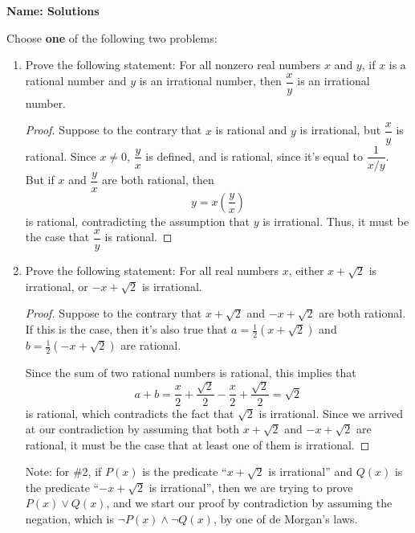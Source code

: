 \documentclass[12pt]{article}
\begin{document}
{\bf Name: Solutions}
\thispagestyle{fancy}

\bigskip
Choose {\bf one} of the following two problems:
\begin{enumerate}
 \item Prove the following statement: For all nonzero real numbers $x$ and $y$, if $x$ is a rational number and $y$ is an irrational number, then $\dfrac{x}{y}$ is an irrational number.
     

\begin{proof}
Suppose to the contrary that $x$ is rational and $y$ is irrational, but $\dfrac{x}{y}$ is rational. Since $x\neq 0$, $\dfrac{y}{x}$ is defined, and is rational, since it's equal to $\dfrac{1}{x/y}$. But if $x$ and $\dfrac{y}{x}$ are both rational, then
\[
 y = x\left(\dfrac{y}{x}\right)
\]
 is rational, contradicting the assumption that $y$ is irrational. Thus, it must be the case that $\dfrac{x}{y}$ is rational.
\end{proof}

\item Prove the following statement: For all real numbers $x$, either $x+\sqrt{2}$ is irrational, or $-x+\sqrt{2}$ is irrational.

\begin{proof}
 Suppose to the contrary that $x+\sqrt{2}$ and $-x+\sqrt{2}$ are both rational. If this is the case, then it's also true that $a = \frac{1}{2}(x+\sqrt{2})$ and $b=\frac{1}{2}(-x+\sqrt{2})$ are rational.

Since the sum of two rational numbers is rational, this implies that
\[
 a+b = \frac{x}{2}+\frac{\sqrt{2}}{2}-\frac{x}{2}+\frac{\sqrt{2}}{2} = \sqrt{2}
\]
is rational, which contradicts the fact that $\sqrt{2}$ is irrational. Since we arrived at our contradiction by assuming that both $x+\sqrt{2}$ and $-x+\sqrt{2}$ are rational, it must be the case that at least one of them is irrational.
\end{proof}
Note: for \#2, if $P(x)$ is the predicate ``$x+\sqrt{2}$ is irrational'' and $Q(x)$ is the predicate ``$-x+\sqrt{2}$ is irrational'', then we are trying to prove $P(x)\vee Q(x)$, and we start our proof by contradiction by assuming the negation, which is $\neg P(x)\wedge \neg Q(x)$, by one of de Morgan's laws.

\end{enumerate}
\end{document}

